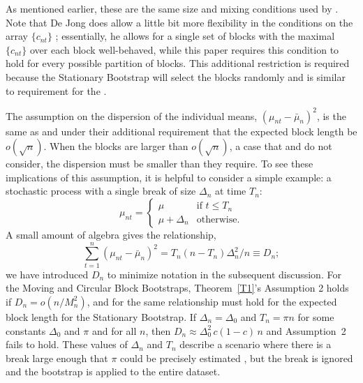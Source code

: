 \documentclass[11pt]{article}
\begin{document}
As mentioned earlier, these are the same size and mixing conditions
used by \citet{Jon:97}.
Note that De Jong does allow a little bit more flexibility in the
conditions on the array $\{c_{nt}\}$ \citep[see also][]{Dav:93};
essentially, he allows for a single set of blocks with the
maximal $\{c_{nt}\}$ over each block well-behaved, while this
paper requires this condition to hold for every possible partition of
blocks.  This additional restriction is required because the
Stationary Bootstrap will select the blocks randomly and is similar to
 requirement for the \fclt.

The assumption on the dispersion of the individual means,
$(\mu_{nt} - \bar\mu_n)^2$, is the same as  and
 under their additional requirement that the
expected block length be $o(\sqrt{n})$. When
the blocks are larger than $o(\sqrt{n})$, a case that \citet{GoW:02}
and \citet{GoJ:03} do not consider, the dispersion must be smaller
than they require.
To see these implications of this assumption, it is helpful to
consider a simple example: a stochastic process with a single break of
size $\Delta_n$ at time $T_n$:
\begin{equation*}
\mu_{nt} =
\begin{cases}
  \mu & \text{if } t \leq T_n \\
  \mu + \Delta_n & \text{otherwise}.
\end{cases}
\end{equation*}
A small amount of algebra gives the relationship,
\begin{equation*}
  \sum_{t=1}^n (\mu_{nt} - \bar \mu_n)^2
  = T_n (n - T_n) \Delta_n^2 / n \equiv D_n;
\end{equation*}
we have introduced $D_n$ to minimize notation in the subsequent
discussion.  For the Moving and Circular Block Bootstraps,
Theorem~\ref{T1}'s Assumption 2 holds if $D_n = o(n / M_n^2)$, and for
the same relationship must hold for the expected block length for the
Stationary Bootstrap. If $\Delta_n = \Delta_0$ and $T_n = \pi n$ for
some constants $\Delta_0$ and $\pi$ and for all $n$, then
$D_n \approx \Delta_0^2 \, c (1 - c) \, n$ and Assumption~2 fails to
hold. These values of $\Delta_n$ and $T_n$ describe a scenario where
there is a break large enough that $\pi$ could be precisely
estimated \citep[as in][]{Bai:94}, but the break is ignored and the
bootstrap is applied to the entire dataset.
\end{document}
